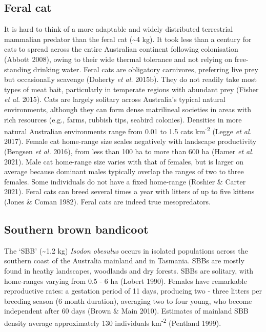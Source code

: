 \documentclass[11pt,a4paper,titlepage,twoside,openright]{style/unimelbthesis}
\begin{document}
\begin{mainmatter}
\hypertarget{feral-cat}{%
\subsection{Feral cat}\label{feral-cat}}

It is hard to think of a more adaptable and widely distributed terrestrial mammalian predator than the feral cat (\textasciitilde4 kg). It took less than a century for cats to spread across the entire Australian continent following colonisation (Abbott 2008), owing to their wide thermal tolerance and not relying on free-standing drinking water. Feral cats are obligatory carnivores, preferring live prey but occasionally scavenge (Doherty \emph{et al.} 2015b). They do not readily take most types of meat bait, particularly in temperate regions with abundant prey (Fisher \emph{et al.} 2015). Cats are largely solitary across Australia's typical natural environments, although they can form dense matrilineal societies in areas with rich resources (e.g., farms, rubbish tips, seabird colonies). Densities in more natural Australian environments range from 0.01 to 1.5 cats km\textsuperscript{-2} (Legge \emph{et al.} 2017). Female cat home-range size scales negatively with landscape productivity (Bengsen \emph{et al.} 2016), from less than 100 ha to more than 600 ha (Hamer \emph{et al.} 2021). Male cat home-range size varies with that of females, but is larger on average because dominant males typically overlap the ranges of two to three females. Some individuals do not have a fixed home-range (Roshier \& Carter 2021). Feral cats can breed several times a year with litters of up to five kittens (Jones \& Coman 1982).
Feral cats are indeed true mesopredators.

\hypertarget{southern-brown-bandicoot}{%
\subsection{Southern brown bandicoot}\label{southern-brown-bandicoot}}

The `SBB' (\textasciitilde1.2 kg) \emph{Isodon obesulus} occurs in isolated populations across the southern coast of the Australia mainland and in Tasmania. SBBs are mostly found in heathy landscapes, woodlands and dry forests. SBBs are solitary, with home-ranges varying from 0.5 - 6 ha (Lobert 1990). Females have remarkable reproductive rates: a gestation period of 11 days, producing two - three litters per breeding season (6 month duration), averaging two to four young, who become independent after 60 days (Brown \& Main 2010). Estimates of mainland SBB density average approximately 130 individuals km\textsuperscript{-2} (Pentland 1999).


\end{mainmatter}
\end{document}
